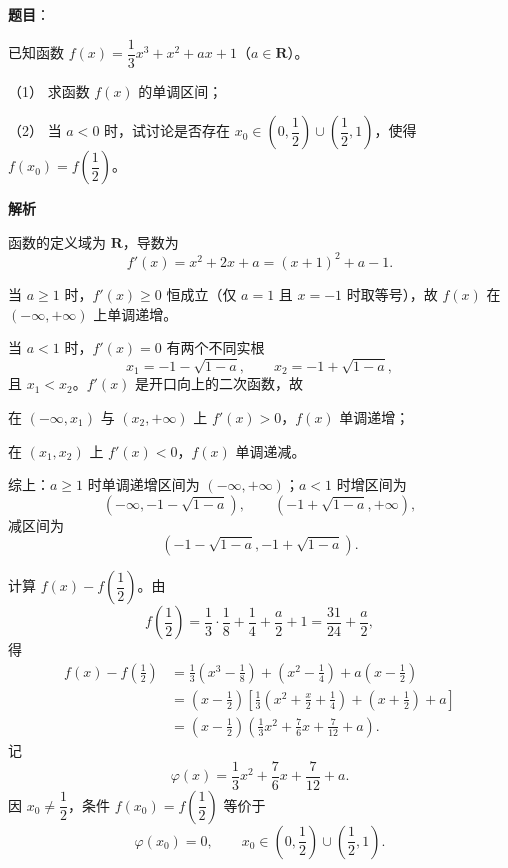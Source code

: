 \begin{answer}

\textbf{题目}：

已知函数 $f(x)=\dfrac13x^3+x^2+ax+1$（$a\in\mathbf R$）。

（1） 求函数 $f(x)$ 的单调区间；

（2） 当 $a<0$ 时，试讨论是否存在 $x_0\in\left(0,\dfrac12\right)\cup\left(\dfrac12,1\right)$，使得 $f(x_0)=f\left(\dfrac12\right)$。

\textbf{解析}


函数的定义域为 $\mathbf R$，导数为
\nopagebreak[4]
\[f'(x)=x^2+2x+a=(x+1)^2+a-1 .\]

当 $a\geqslant1$ 时，$f'(x)\geqslant0$ 恒成立（仅 $a=1$ 且 $x=-1$ 时取等号），故 $f(x)$ 在 $(-\infty,+\infty)$ 上单调递增。

当 $a<1$ 时，$f'(x)=0$ 有两个不同实根
\nopagebreak[4]
\[x_1=-1-\sqrt{1-a},\qquad x_2=-1+\sqrt{1-a},\]
且 $x_1<x_2$。$f'(x)$ 是开口向上的二次函数，故

在 $(-\infty,x_1)$ 与 $(x_2,+\infty)$ 上 $f'(x)>0$，$f(x)$ 单调递增；

在 $(x_1,x_2)$ 上 $f'(x)<0$，$f(x)$ 单调递减。

综上：$a\geqslant1$ 时单调递增区间为 $(-\infty,+\infty)$；$a<1$ 时增区间为
\nopagebreak[4]
\[\left(-\infty,-1-\sqrt{1-a}\right),\qquad\left(-1+\sqrt{1-a},+\infty\right),\]
减区间为
\nopagebreak[4]
\[\left(-1-\sqrt{1-a},-1+\sqrt{1-a}\right).\]


计算 $f(x)-f\left(\dfrac12\right)$。由
\nopagebreak[4]
\[f\left(\frac12\right)=\frac13\cdot\frac18+\frac14+\frac a2+1=\frac{31}{24}+\frac a2,\]
得
\nopagebreak[4]
\[\begin{aligned}
f(x)-f\left(\frac12\right)
&=\frac13\left(x^3-\frac18\right)+\left(x^2-\frac14\right)+a\left(x-\frac12\right)\\
&=\left(x-\frac12\right)\left[\frac13\left(x^2+\frac x2+\frac14\right)+\left(x+\frac12\right)+a\right]\\
&=\left(x-\frac12\right)\left(\frac13x^2+\frac76x+\frac7{12}+a\right).
\end{aligned}\]
记
\nopagebreak[4]
\[\varphi(x)=\frac13x^2+\frac76x+\frac7{12}+a .\]
因 $x_0\neq\dfrac12$，条件 $f(x_0)=f\left(\dfrac12\right)$ 等价于
\nopagebreak[4]
\[\varphi(x_0)=0,\qquad x_0\in\left(0,\frac12\right)\cup\left(\frac12,1\right).\]


\end{answer}
